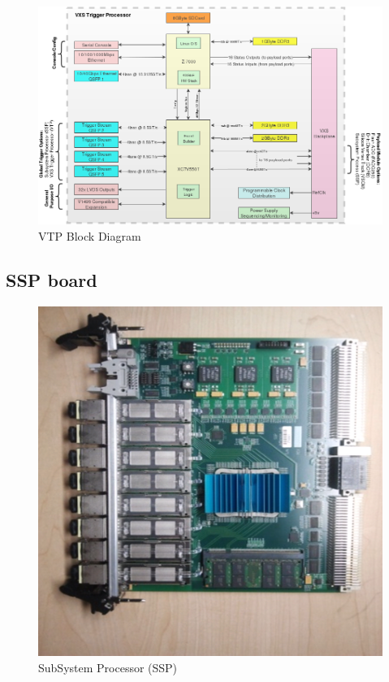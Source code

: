 \begin{figure}[hbt]
	\centering
	\includegraphics[width=1.0\columnwidth,keepaspectratio]{img/vtp_block_daq.png}
	\caption{VTP Block Diagram}
	\label{fig:vtp_block_daq}
\end{figure}


\subsection{SSP board}

\begin{figure}[hbt]
	\centering
	\includegraphics[width=1.0\columnwidth,keepaspectratio]{img/ssp_board.png}
	\caption{SubSystem Processor (SSP)}
	\label{fig:ssp_board}
\end{figure}

